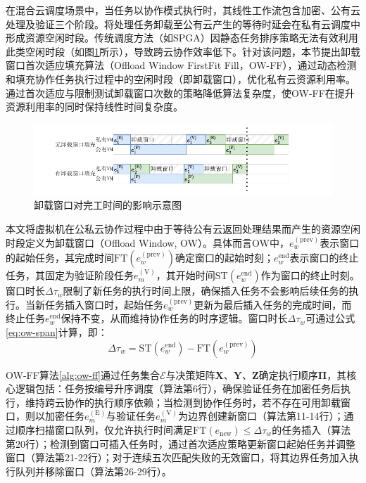 在混合云调度场景中，当任务以协作模式执行时，其线性工作流包含加密、公有云处理及验证三个阶段。将处理任务卸载至公有云产生的等待时延会在私有云调度中形成资源空闲时段。传统调度方法（如SPGA\cite{huangImprovedGeneticAlgorithm2023}）因静态任务排序策略无法有效利用此类空闲时段（如图\ref{fig:ow-util}所示），导致跨云协作效率低下。针对该问题，本节提出卸载窗口首次适应填充算法（Offload Window FirstFit Fill，OW-FF），通过动态检测和填充协作任务执行过程中的空闲时段（即卸载窗口），优化私有云资源利用率。通过首次适应与限制测试卸载窗口次数的策略降低算法复杂度，使OW-FF在提升资源利用率的同时保持线性时间复杂度。

\begin{figure}[htb]
    \includegraphics{img/考虑和未考虑卸载窗口.pdf}
    \caption{卸载窗口对完工时间的影响示意图}
    \label{fig:ow-util}
\end{figure}

本文将虚拟机在公私云协作过程中由于等待公有云返回处理结果而产生的资源空闲时段定义为卸载窗口（Offload Window, OW）。具体而言OW中，\( e_w^{(\text{prev})} \)表示窗口的起始任务，其完成时间\( \text{FT}(e_w^{(\text{prev})}) \)确定窗口的起始时刻；\( e_w^\text{end} \)表示窗口的终止任务，其固定为验证阶段任务\( e_m^{(\text{V})} \)，其开始时间\( \text{ST}(e_w^\text{end}) \)作为窗口的终止时刻。窗口时长\( \Delta\tau_w \)限制了新任务的执行时间上限，确保插入任务不会影响后续任务的执行。当新任务插入窗口时，起始任务\( e_w^{(\text{prev})} \)更新为最后插入任务的完成时间，而终止任务\( e_w^\text{end} \)保持不变，从而维持协作任务的时序逻辑。窗口时长$\Delta\tau_w$可通过公式\eqref{eq:ow-span}计算，即：
\begin{equation}
    \Delta\tau_w = \text{ST}(e_w^\text{end}) - \text{FT}(e_w^{(\text{prev})})
    \label{eq:ow-span}
\end{equation}

OW-FF算法\ref{alg:ow-ff}通过任务集合$\mathcal{E}$与决策矩阵$\mathbf{X}$、$\mathbf{Y}$、$\mathbf{Z}$确定执行顺序$\mathbf{\Pi}$，其核心逻辑包括：任务按编号升序调度（算法第6行），确保验证任务在加密任务后执行，维持跨云协作的执行顺序依赖；当检测到协作任务时，若不存在可用卸载窗口，则以加密任务$e_m^{(\text{E})}$与验证任务$e_m^{(\text{V})}$为边界创建新窗口（算法第11-14行）；通过顺序扫描窗口队列，仅允许执行时间满足$\text{FT}(e_{\text{new}})\leq\Delta\tau_w$的任务插入（算法第20行）；检测到窗口可插入任务时，通过首次适应策略更新窗口起始任务并调整窗口（算法第21-22行）；对于连续五次匹配失败的无效窗口，将其边界任务加入执行队列并移除窗口（算法第26-29行）。

